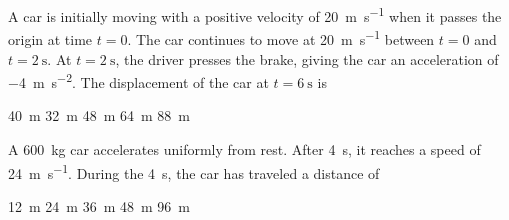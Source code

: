 \documentclass{../../../oss-ap12ibhl}
\begin{document}
\begin{questions}
  \question A car is initially moving with a positive velocity of
  \SI{20}{\metre\per\second} when it passes the origin at time $t=0$. The car
  continues to move at \SI{20}{\metre\per\second} between $t=0$ and
  $t=\SI{2}{\second}$. At $t=\SI{2}{\second}$, the driver presses the brake,
  giving the car an acceleration of \SI{-4}{\metre\per\second\squared}. The
  displacement of the car at $t=\SI{6}{\second}$ is
  \begin{choices}
    \choice\SI{40}{\metre}
    \choice\SI{32}{\metre}
    \choice\SI{48}{\metre}
    \choice\SI{64}{\metre}
    \choice\SI{88}{\metre}
  \end{choices}
  

  \question A \SI{600}{\kilo\gram} car accelerates uniformly from rest. After
  \SI{4}{\second}, it reaches a speed of \SI{24}{\metre\per\second}. During
  the \SI{4}{\second}, the car has traveled a distance of
  \begin{choices}
    \choice\SI{12}{\metre}
    \choice\SI{24}{\metre}
    \choice\SI{36}{\metre}
    \choice\SI{48}{\metre}
    \choice\SI{96}{\metre}
  \end{choices}



\end{questions}
\end{document}
